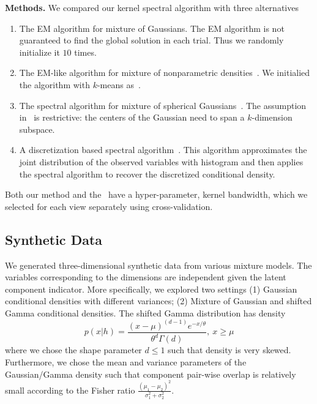 \documentclass{article}
\begin{document}
{\bf Methods.} We compared our kernel spectral algorithm with three alternatives
\begin{enumerate}
  \vspace{-1mm}
  \item The EM algorithm for mixture of Gaussians. The EM algorithm is not guaranteed to find the global solution in each trial. Thus we randomly initialize it $10$ times.
  \item The EM-like algorithm for mixture of nonparametric densities~\citep{BenChaHun09}. We initialied the algorithm with $k$-means as~\citet{BenChaHun09}.
  \item The spectral algorithm for mixture of spherical Gaussians~\citep{HsuKak13}. The assumption in~\citet{HsuKak13} is restrictive: the centers of the Gaussian need to span a $k$-dimension subspace.
  \item A discretization based spectral algorithm~\citep{HirKat10}. This algorithm approximates the joint distribution of the observed variables with histogram and then applies the spectral algorithm to recover the discretized conditional density.
  \vspace{-1mm}
\end{enumerate}
Both our method and the~\cite{BenChaHun09} have a hyper-parameter, kernel bandwidth, which we selected for each view separately using cross-validation.

\vspace{-3mm}
\subsection{Synthetic Data}
\vspace{-2mm}

We generated three-dimensional synthetic data from various mixture models. The variables corresponding to the dimensions are independent given the latent component indicator. More specifically, we explored two settings (1) Gaussian conditional densities with different variances; (2) Mixture of Gaussian and shifted Gamma conditional densities.
%
%
The shifted Gamma distribution has density
$$p(x|h)=\frac{(x-\mu)^{(d-1)}e^{-x/\theta}}{\theta^d \Gamma(d)},~x\geq \mu$$
where we chose the shape parameter $d\le 1$ such that density is very skewed. Furthermore, we chose the mean and variance parameters of the Gaussian/Gamma density such that component pair-wise overlap is relatively small according to the Fisher ratio $\frac{(\mu_1 - \mu_2)^2}{\sigma_1^2+\sigma_2^2}$.
\end{document}
